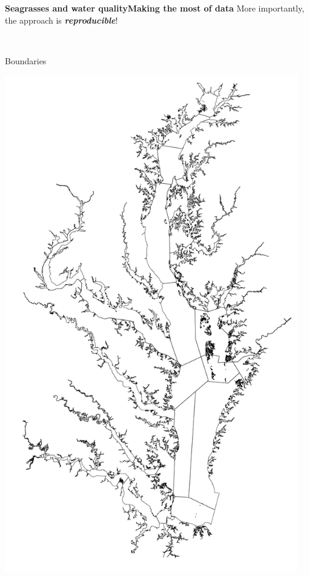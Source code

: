 \documentclass[serif]{beamer}\usepackage[]{graphicx}\usepackage[]{color}
\newcommand{\emtxt}[1]{\textbf{\textit{#1}}}
\begin{document}
\begin{frame}{\textbf{Seagrasses and water quality}}{\textbf{Making the most of data}}
More importantly, the approach is \emtxt{reproducible}! \\~\\
\begin{columns}
\begin{column}{0.3\textwidth}
Boundaries
\centerline{\includegraphics[width = \textwidth]{fig/cb_seg.pdf}}
\end{column}
\begin{column}{0.3\textwidth}

\end{column}
\end{columns}
\end{frame}
\end{document}
